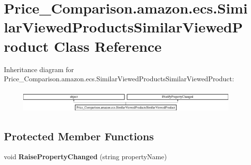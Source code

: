 \hypertarget{class_price___comparison_1_1amazon_1_1ecs_1_1_similar_viewed_products_similar_viewed_product}{\section{Price\-\_\-\-Comparison.\-amazon.\-ecs.\-Similar\-Viewed\-Products\-Similar\-Viewed\-Product Class Reference}
\label{class_price___comparison_1_1amazon_1_1ecs_1_1_similar_viewed_products_similar_viewed_product}
}


 


Inheritance diagram for Price\-\_\-\-Comparison.\-amazon.\-ecs.\-Similar\-Viewed\-Products\-Similar\-Viewed\-Product\-:\begin{figure}[H]
\begin{center}
\leavevmode
\includegraphics[height=1.236203cm]{class_price___comparison_1_1amazon_1_1ecs_1_1_similar_viewed_products_similar_viewed_product}
\end{center}
\end{figure}
\subsection*{Protected Member Functions}
\begin{DoxyCompactItemize}
\item 
\hypertarget{class_price___comparison_1_1amazon_1_1ecs_1_1_similar_viewed_products_similar_viewed_product_a0299434d102899421c0d6dbc96959fba}{void {\bfseries Raise\-Property\-Changed} (string property\-Name)}\label{class_price___comparison_1_1amazon_1_1ecs_1_1_similar_viewed_products_similar_viewed_product_a0299434d102899421c0d6dbc96959fba}

\end{DoxyCompactItemize}

